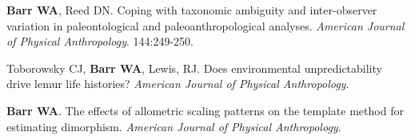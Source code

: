 \documentclass{article}
\begin{document}
\begin{etaremune}
\item {\bfseries Barr WA}, Reed DN. Coping with taxonomic ambiguity and inter-observer variation in paleontological and paleoanthropological analyses. \emph{American Journal of Physical Anthropology}. 144:249-250.


\item Toborowsky CJ, {\bfseries Barr WA}, Lewis, RJ. Does environmental unpredictability drive lemur life histories? \emph{American Journal of Physical Anthropology}.


\item {\bfseries Barr WA}. The effects of allometric scaling patterns on the template method for estimating dimorphism. \emph{American Journal of Physical Anthropology}.


\end{etaremune}
\end{document}
